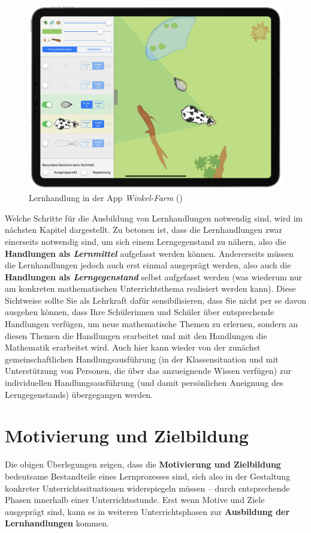 \documentclass[
]{scrbook}
\theoremstyle{definition}
\theoremstyle{definition}
\theoremstyle{definition}
\theoremstyle{definition}
\theoremstyle{remark}
\begin{document}
\begin{figure}

{\centering \includegraphics[width=0.5\linewidth]{pictures/1-Winkelfarm} 

}

\caption{Lernhandlung in der App \emph{Winkel-Farm} ()}\label{fig:HandlungSchaf}
\end{figure}

Welche Schritte für die Ausbildung von Lernhandlungen notwendig sind, wird im nächsten Kapitel dargestellt.
Zu betonen ist, dass die Lernhandlungen zwar einerseits notwendig sind, um sich einem Lerngegenstand zu nähern, also die \textbf{Handlungen als \emph{Lernmittel}} aufgefasst werden können. Andererseits müssen die Lernhandlungen jedoch auch erst einmal ausgeprägt werden, also auch die \textbf{Handlungen als \emph{Lerngegenstand}} selbst aufgefasst werden (was wiederum nur am konkreten mathematischen Unterrichtsthema realisiert werden kann). Diese Sichtweise sollte Sie als Lehrkraft dafür sensibilisieren, dass Sie nicht per se davon ausgehen können, dass Ihre Schülerinnen und Schüler über entsprechende Handlungen verfügen, um neue mathematische Themen zu erlernen, sondern an diesen Themen die Handlungen erarbeitet und mit den Handlungen die Mathematik erarbeitet wird. Auch hier kann wieder von der zunächst gemeinschaftlichen Handlungsausführung (in der Klassensituation und mit Unterstützung von Personen, die über das anzueignende Wissen verfügen) zur individuellen Handlungsausführung (und damit persönlichen Aneignung des Lerngegenstands) übergegangen werden.

\section{Motivierung und Zielbildung}\label{motivierung-und-zielbildung}

Die obigen Überlegungen zeigen, dass die \textbf{Motivierung und Zielbildung} bedeutsame Bestandteile eines Lernprozesses sind, sich also in der Gestaltung konkreter Unterrichtssituationen widerspiegeln müssen -- durch entsprechende Phasen innerhalb einer Unterrichtsstunde. Erst wenn Motive und Ziele ausgeprägt sind, kann es in weiteren Unterrichtsphasen zur \textbf{Ausbildung der Lernhandlungen} kommen.
\end{document}
